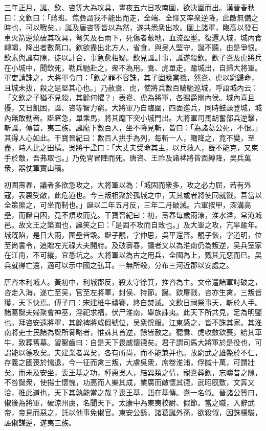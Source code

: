 \begin{pinyinscope}
三年正月，誕、欽、咨等大為攻具，晝夜五六日攻南圍，欲決圍而出。漢晉春秋曰：文欽曰：「蔣班、焦彝謂我不能出而走，全端、全懌又率衆逆降，此敵無備之時也，可以戰矣。」誕及唐咨等皆以為然，遂共悉衆出攻。圍上諸軍，臨高以發石車火箭逆燒破其攻具，弩矢及石雨下，死傷者蔽地，血流盈壍。復還入城，城內食轉竭，降出者數萬口。欽欲盡出北方人，省食，與吴人堅守，誕不聽，由是爭恨。欽素與誕有隙，徒以計合，事急愈相疑。欽見誕計事，誕遂殺欽。欽子鴦及虎將兵在小城中，聞欽死，勒兵馳赴之，衆不為用。鴦、虎單走，踰城出，自歸大將軍。軍吏請誅之，大將軍令曰：「欽之罪不容誅，其子固應當戮，然鴦、虎以窮歸命，且城未拔，殺之是堅其心也。」乃赦鴦、虎，使將兵數百騎馳巡城，呼語城內云：「文欽之子猶不見殺，其餘何懼？」表鴦、虎為將軍，各賜爵關內侯。城內喜且擾，又日飢困，誕、咨等智力窮。大將軍乃自臨圍，四靣進兵，同時鼓譟登城，城內無敢動者。誕窘急，單乘馬，將其麾下突小城門出。大將軍司馬胡奮部兵逆擊，斬誕，傳首，夷三族。誕麾下數百人，坐不降見斬，皆曰：「為諸葛公死，不恨。」其得人心如此。干寶晉紀曰：數百人拱手為列，每斬一人，輙降之，竟不變，至盡，時人比之田橫。吳將于詮曰：「大丈夫受命其主，以兵救人，旣不能克，又束手於敵，吾弗取也。」乃免冑冒陣而死。唐咨、王祚及諸裨將皆靣縛降，吴兵萬衆，器仗軍實山積。

初圍壽春，議者多欲急攻之，大將軍以為：「城固而衆多，攻之必力屈，若有外寇，表裏受敵，此危道也。今三叛相聚於孤城之中，天其或者將使同就戮，吾當以全策縻之，可坐而制也。」誕以二年五月反，三年二月破滅。六軍按甲，深溝高壘，而誕自困，竟不煩攻而克。干寶晉紀曰：初，壽春每歲雨潦，淮水溢，常淹城邑。故文王之築圍也，誕笑之曰：「是固不攻而自敗也。」及大軍之攻，亢旱踰年。城旣陷，是日大雨，圍壘皆毀。誕子靚，字仲思，吳平還晉。靚子恢，字道明，位至尚書令，追贈左光祿大夫開府。及破壽春，議者又以為淮南仍為叛逆，吴兵室家在江南，不可縱，宜悉坑之。大將軍以為古之用兵，全國為上，戮其元惡而已。吴兵就得亡還，適可以示中國之弘耳。一無所殺，分布三河近郡以安處之。

唐咨本利城人。黃初中，利城郡反，殺太守徐箕，推咨為主。文帝遣諸軍討破之，咨走入海，遂亡至吴，官至左將軍，封侯、持節。誕、欽屠戮，咨亦生禽，三叛皆獲，天下快焉。傅子曰：宋建椎牛禱賽，終自焚滅。文欽日祠祭事天，斬於人手。諸葛誕夫婦聚會神巫，淫祀求福，伏尸淮南，舉族誅夷。此天下所共見，足為明鑒也。拜咨安遠將軍，其餘裨將咸假號位，吴衆恱服。江東感之，皆不誅其家。其淮南將吏士民諸為誕所脅略者，惟誅其首逆，餘皆赦之。聽鴦、虎收斂欽喪，給其車牛，致葬舊墓。習鑿齒曰：自是天下畏威懷德矣。君子謂司馬大將軍於是役也，可謂能以德攻矣。夫建業者異矣，各有所尚，而不能兼并也。故窮武之雄斃於不仁，存義之國喪於懦退，今一征而禽三叛，大虜吳衆，席卷淮浦，俘馘十萬，可謂壯矣。而未及安坐，喪王基之功，種惠吳人，結異類之情，寵鴦葬欽，忘疇昔之隙，不咎誕衆，使揚士懷愧，功高而人樂其成，業廣而敵懷其德，武昭旣敷，文筭又洽，推此道也，天下其孰能當之哉？喪王基，語在基傳。鴦一名俶。晉諸公贊曰，俶後為將軍，破涼州虜，名聞天下。太康中為東夷校尉、假節。當之職，入辭武帝，帝見而惡之，託以他事免俶官。東安公繇，諸葛誕外孫，欲殺俶，因誅楊駿，誣俶謀逆，遂夷三族。


\end{pinyinscope}